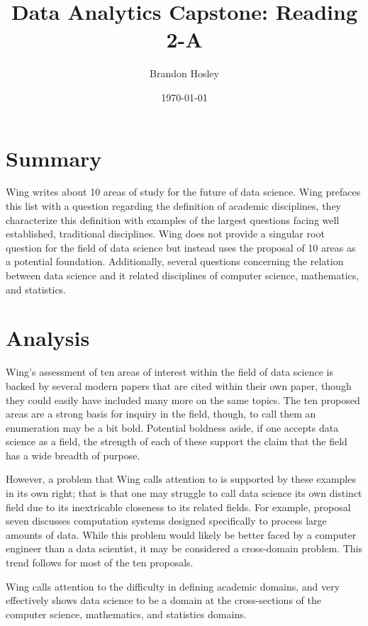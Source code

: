 \documentclass[]{article}
\title{Data Analytics Capstone: Reading 2-A}
\author{Brandon Hosley}
\date{\today}
\begin{document}
	\maketitle
	
\section{Summary} 

Wing \cite{Wing2020} writes about 10 areas of study for the future of data science.
Wing prefaces this list with a question regarding the definition of academic disciplines,
they characterize this definition with examples of the largest questions facing well established, traditional disciplines.
Wing does not provide a singular root question for the field of data science but instead uses the proposal of 10 areas as a potential foundation.
Additionally, several questions concerning the relation between data science and it related disciplines of computer science, mathematics, and statistics.


\section{Analysis}

Wing's assessment of ten areas of interest within the field of data science is backed by several modern papers that are cited within their own paper, though they could easily have included many more on the same topics.
The ten proposed areas are a strong basis for inquiry in the field, though, to call them an enumeration may be a bit bold.
Potential boldness aside, if one accepts data science as a field, the strength of each of these support the claim that the field has a wide breadth of purpose.

However, a problem that Wing calls attention to is supported by these examples in its own right;
that is that one may struggle to call data science its own distinct field due to its inextricable closeness to its related fields.
For example, proposal seven discusses computation systems designed specifically to process large amounts of data. 
While this problem would likely be better faced by a computer engineer than a data scientist, it may be considered a cross-domain problem.
This trend follows for most of the ten proposals.

Wing calls attention to the difficulty in defining academic domains, and very effectively shows data science to be a domain at the cross-sections of the computer science, mathematics, and statistics domains.

\clearpage


\end{document}
